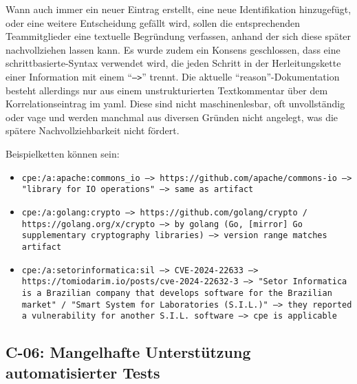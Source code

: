 Wann auch immer ein neuer Eintrag erstellt, eine neue Identifikation hinzugefügt, oder eine weitere Entscheidung gefällt wird, sollen die entsprechenden Teammitglieder eine textuelle Begründung verfassen, anhand der sich diese später nachvollziehen lassen kann.
Es wurde zudem ein Konsens geschlossen, dass eine schrittbasierte-Syntax verwendet wird, die jeden Schritt in der Herleitungskette einer Information mit einem \enquote{\texttt{-->}} trennt.
Die aktuelle \enquote{reason}-Dokumentation besteht allerdings nur aus einem unstrukturierten Textkommentar über dem Korrelationseintrag im \acrshort{yaml}.
Diese sind nicht maschinenlesbar, oft unvollständig oder vage und werden manchmal aus diversen Gründen nicht angelegt, was die spätere Nachvollziehbarkeit nicht fördert.

Beispielketten können sein:

\begin{itemize}
    \itemsep0em
    \item \texttt{cpe:/a:apache:commons\_io --> https://github.com/apache/commons-io --> "library for IO operations" --> same as artifact}
    \item \texttt{cpe:/a:golang:crypto --> https://github.com/golang/crypto / https://golang.org/x/crypto --> by golang (Go, [mirror] Go supplementary cryptography libraries) --> version range matches artifact}
    \item \texttt{cpe:/a:setorinformatica:sil --> CVE-2024-22633 --> https://tomiodarim.io/posts/cve-2024-22632-3 --> "Setor Informatica is a Brazilian company that develops software for the Brazilian market" / "Smart System for Laboratories (S.I.L.)" --> they reported a vulnerability for another S.I.L. software --> cpe is applicable}
\end{itemize}

\subsection{C-06: Mangelhafte Unterstützung automatisierter Tests}\label{subsec:c-06-falle-ohne-aktion-konnen-nicht-dokumentiert-werden}


